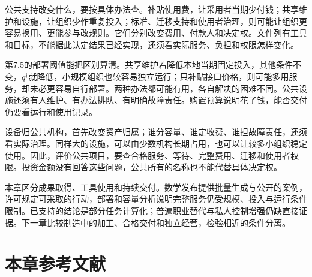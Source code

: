 \documentclass[UTF8,fontset=windows,12pt,a4paper,oneside,openany]{ctexbook}
\begin{document}
公共支持改变什么，要按具体办法查。补贴使用费，让采用者当期少付钱；共享维护和设施，让组织少作重复投入；标准、迁移支持和使用者治理，则可能让组织更容易换用、更能参与改规则。它们分别改变费用、付款人和决定权。文件列有工具和目标，不能据此认定结果已经实现，还须看实际服务、负担和权限怎样变化。

第7.5的部署阈值能把区别算清。共享维护若降低本地当期固定投入，其他条件不变，$q^{\dagger}$就降低，小规模组织也较容易独立运行；只补贴接口价格，则可能多用服务，却未必更容易自行部署。两种办法都可能有用，各自解决的困难不同。公共设施还须有人维护、有办法排队、有明确故障责任。购置预算说明花了钱，能否交付仍要看运行和使用记录。

设备归公共机构，首先改变资产归属；谁分容量、谁定收费、谁担故障责任，还须看实际治理。同样大的设施，可以由少数机构长期占用，也可以让较多小组织稳定使用。因此，评价公共项目，要查合格服务、等待、完整费用、迁移和使用者权限。投资金额没有回答这些问题，公共所有的名称也不能代替具体决定权。

本章区分成果取得、工具使用和持续交付。数学发布提供批量生成与公开的案例，许可规定可采取的行动，部署和容量分析说明完整服务仍受规模、投入与运行条件限制。已支持的结论是部分任务计算化；普遍职业替代与私人控制增强仍缺直接证据。下一章比较制造中的加工、合格交付和独立经营，检验相近的条件分离。

\section*{本章参考文献}
\end{document}
